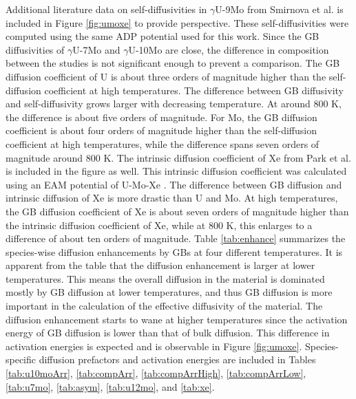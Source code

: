 \documentclass{elsarticle}
\begin{document}
Additional literature data on self-diffusivities in $\gamma$U-9Mo from Smirnova et al. \cite{smirnova2015} is included in Figure \ref{fig:umoxe} to provide perspective. These self-diffusivities were computed using the same ADP potential used for this work. Since the GB diffusivities of $\gamma$U-7Mo and $\gamma$U-10Mo are close, the difference in composition between the studies is not significant enough to prevent a comparison. The GB diffusion coefficient of U is about three orders of magnitude higher than the self-diffusion coefficient at high temperatures. The difference between GB diffusivity and self-diffusivity grows larger with decreasing temperature. At around 800 K, the difference is about five orders of magnitude. For Mo, the GB diffusion coefficient is about four orders of magnitude higher than the self-diffusion coefficient at high temperatures, while the difference spans seven orders of magnitude around 800 K. The intrinsic diffusion coefficient of Xe from Park et al. \cite{park2023} is included in the figure as well. This intrinsic diffusion coefficient was calculated using an EAM potential of U-Mo-Xe \cite{smirnova2013}. The difference between GB diffusion and intrinsic diffusion of Xe is more drastic than U and Mo. At high temperatures, the GB diffusion coefficient of Xe is about seven orders of magnitude higher than the intrinsic diffusion coefficient of Xe, while at 800 K, this enlarges to a difference of about ten orders of magnitude. Table \ref{tab:enhance} summarizes the species-wise diffusion enhancements by GBs at four different temperatures. It is apparent from the table that the diffusion enhancement is larger at lower temperatures. This means the overall diffusion in the material is dominated mostly by GB diffusion at lower temperatures, and thus GB diffusion is more important in the calculation of the effective diffusivity of the material. The diffusion enhancement starts to wane at higher temperatures since the activation energy of GB diffusion is lower than that of bulk diffusion. This difference in activation energies is expected and is observable in Figure \ref{fig:umoxe}. Species-specific diffusion prefactors and activation energies are included in Tables \ref{tab:u10moArr}, \ref{tab:compArr}, \ref{tab:compArrHigh}, \ref{tab:compArrLow}, \ref{tab:u7mo}, \ref{tab:asym}, \ref{tab:u12mo}, and \ref{tab:xe}. 
\end{document}
